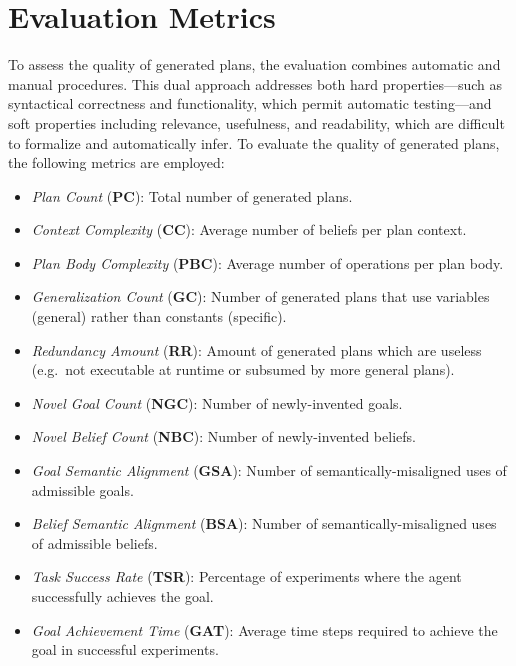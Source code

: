 \documentclass[12pt,a4paper,openright,twoside]{book}
\begin{document}

\section{Evaluation Metrics}

To assess the quality of generated plans, the evaluation combines automatic and manual procedures.
%
This dual approach addresses both hard properties—such as syntactical correctness and functionality, which permit automatic testing—and soft properties including relevance, usefulness, and readability, which are difficult to formalize and automatically infer.
%
To evaluate the quality of generated plans, the following metrics are employed:
\newcommand{\PC}{\textbf{PC}}
\newcommand{\CC}{\textbf{CC}}
\newcommand{\PBC}{\textbf{PBC}}
\newcommand{\GR}{\textbf{GC}}
\newcommand{\RR}{\textbf{RR}}
\newcommand{\NGC}{\textbf{NGC}}
\newcommand{\NBC}{\textbf{NBC}}
\newcommand{\GSA}{\textbf{GSA}}
\newcommand{\BSA}{\textbf{BSA}}
\newcommand{\TSR}{\textbf{TSR}}
\newcommand{\GAT}{\textbf{GAT}}
\newcommand{\PRAS}{\textbf{PRAS}}
\begin{itemize}
    \item \emph{Plan Count} (\PC): Total number of generated plans.
    \item \emph{Context Complexity} (\CC): Average number of beliefs per plan context.
    \item \emph{Plan Body Complexity} (\PBC): Average number of operations per plan body.
    \item \emph{Generalization Count} (\GR): Number of generated plans that use variables (general) rather than constants (specific).
     \item \emph{Redundancy Amount} (\RR): Amount of generated plans which are useless (e.g.\, not executable at runtime or subsumed by more general plans).
    \item \emph{Novel Goal Count} (\NGC): Number of newly-invented goals.
    \item \emph{Novel Belief Count} (\NBC): Number of newly-invented beliefs.
    \item \emph{Goal Semantic Alignment} (\GSA): Number of semantically-misaligned uses of admissible goals.
    \item \emph{Belief Semantic Alignment} (\BSA): Number of semantically-misaligned uses of admissible beliefs.
    \item \emph{Task Success Rate} (\TSR): Percentage of experiments where the agent successfully achieves the  goal.
    \item \emph{Goal Achievement Time} (\GAT): Average time steps required to achieve the goal in successful experiments.
\end{itemize}
\end{document}
